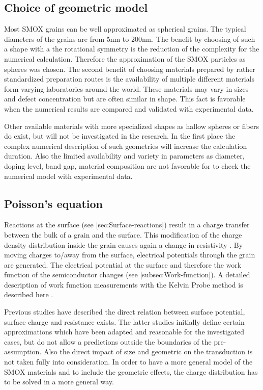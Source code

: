 \documentclass[11pt]{article}
\begin{document}
    \hypertarget{choice-of-geometric-model}{%
\subsection{Choice of geometric model}\label{choice-of-geometric-model}}

Most SMOX grains can be well approximated as spherical grains. The
typical diameters of the grains are from 5nm to 200nm. The benefit by
choosing of such a shape with a the rotational symmetry is the reduction
of the complexity for the numerical calculation. Therefore the
approximation of the SMOX particles as spheres was chosen. The second
benefit of choosing materials prepared by rather standardized
preparation routes is the availability of multiple different materials
form varying laboratories around the world. These materials may vary in
sizes and defect concentration but are often similar in shape. This fact
is favorable when the numerical results are compared and validated with
experimental data.

Other available materials with more specialized shapes as hallow spheres
or fibers do exist, but will not be investigated in the research. In the
first place the complex numerical description of such geometries will
increase the calculation duration. Also the limited availability and
variety in parameters as diameter, doping level, band gap, material
composition are not favorable for to check the numerical model with
experimental data.

    \hypertarget{poissons-equation}{%
\subsection{Poisson's equation}\label{poissons-equation}}

Reactions at the surface (see {[}sec:Surface-reactions{]}) result in a
charge transfer between the bulk of a grain and the surface. This
modification of the charge density distribution inside the grain causes
again a change in resistivity . By moving charges to/away from the
surface, electrical potentials through the grain are generated. The
electrical potential at the surface and therefore the work function of
the semiconductor changes (see {[}subsec:Work-function{]}). A detailed
description of work function measurements with the Kelvin Probe method
is described here \cite{Oprea2009a}.

Previous studies have described the direct relation between surface
potential, surface charge and resistance exists. The latter studies
initially define certain approximations which have been adapted and
reasonable for the investigated cases, but do not allow a predictions
outside the boundaries of the pre-assumption. Also the direct impact of
size and geometric on the transduction is not taken fully into
consideration. In order to have a more general model of the SMOX
materials and to include the geometric effects, the charge distribution
has to be solved in a more general way.
\end{document}
